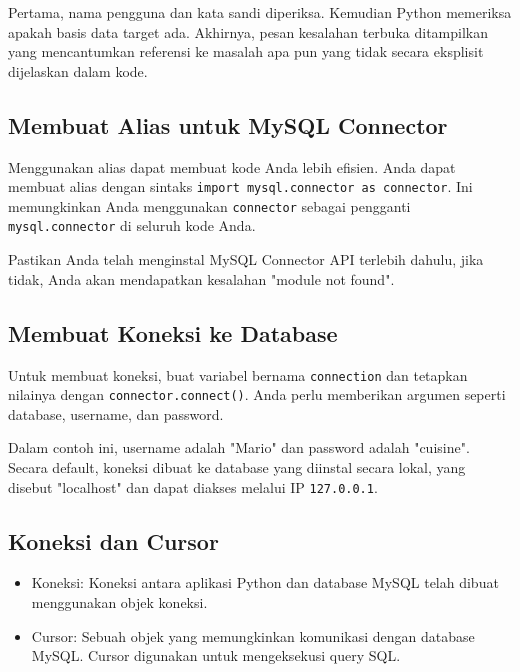 \documentclass{article}
\begin{document}
\begin{itemize}
            Pertama, nama pengguna dan kata sandi diperiksa. Kemudian Python memeriksa apakah basis data target ada. Akhirnya, pesan kesalahan terbuka ditampilkan yang mencantumkan referensi ke masalah apa pun yang tidak secara eksplisit dijelaskan dalam kode.


\end{itemize}

\subsection{Membuat Alias untuk MySQL Connector}
Menggunakan alias dapat membuat kode Anda lebih efisien. Anda dapat membuat alias dengan sintaks \verb|import mysql.connector as connector|. Ini memungkinkan Anda menggunakan \verb|connector| sebagai pengganti \verb|mysql.connector| di seluruh kode Anda.

Pastikan Anda telah menginstal MySQL Connector API terlebih dahulu, jika tidak, Anda akan mendapatkan kesalahan "module not found".

\subsection{Membuat Koneksi ke Database}
Untuk membuat koneksi, buat variabel bernama \verb|connection| dan tetapkan nilainya dengan \verb|connector.connect()|. Anda perlu memberikan argumen seperti database, username, dan password.

Dalam contoh ini, username adalah "Mario" dan password adalah "cuisine". Secara default, koneksi dibuat ke database yang diinstal secara lokal, yang disebut "localhost" dan dapat diakses melalui IP \verb|127.0.0.1|.

\subsection{Koneksi dan Cursor}
\begin{itemize}
      \item Koneksi: Koneksi antara aplikasi Python dan database MySQL telah dibuat menggunakan objek koneksi.
      \item Cursor: Sebuah objek yang memungkinkan komunikasi dengan database MySQL. Cursor digunakan untuk mengeksekusi query SQL.
\end{itemize}
\end{document}
